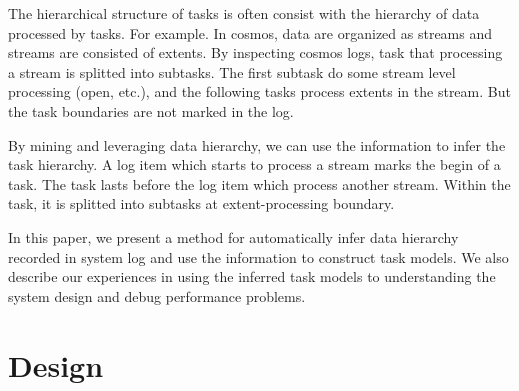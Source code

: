 The hierarchical structure of tasks is often consist with
the hierarchy of data processed by tasks. For example. In
cosmos, data are organized as streams and streams are
consisted of extents. By inspecting cosmos logs, task that
processing a stream is splitted into subtasks. The first
subtask do some stream level processing (open, etc.), and
the following tasks process extents in the stream. But the
task boundaries are not marked in the log.

By mining and leveraging data hierarchy, we can use the
information to infer the task hierarchy. A log item which
starts to process a stream marks the begin of a task. The
task lasts before the log item which process another stream.
Within the task, it is splitted into subtasks at
extent-processing boundary.

In this paper, we present a method for automatically infer
data hierarchy recorded in system log and use the
information to construct task models.  We also describe our
experiences in using the inferred task models to
understanding the system design and debug performance
problems.



\section{Design}
\label{sec:design}

